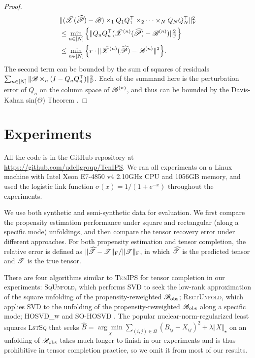 \documentclass{article}
\newcommand{\T}[2][]{#1\mathscr{\MakeUppercase{#2}}}
\newcommand{\norm}[1]{\Vert #1 \Vert}
\newcommand{\fnorm}[1]{\norm{#1}_{\mathrm{F}}}
\newcommand{\nucnorm}[1]{\norm{#1}_\star}
\def\Th{\widehat T}
\def\Ph{\widehat P}
\theoremstyle{plain}
\begin{document}
\begin{proof}
\begin{equation}
		\begin{aligned}
			& \fnorm{(\bar{\T{X}}(\T{\Ph})-\T{B}) \times_1 Q_1Q_1^\top \times_2 \cdots \times_N Q_N Q_N^\top}^2 \\
			& \leq \min_{n \in [N]} \Big\{\fnorm{Q_n Q_n^\top (\bar{\T{X}}^{(n)}(\T{\Ph}) - \T{B}^{(n)})}^2 \Big\}\\
			& \leq \min_{n \in [N]} \Big\{r \cdot \norm{\bar{\T{X}}^{(n)}(\T{\Ph}) - \T{B}^{(n)}}^2 \Big\}.
		\end{aligned}
		\nonumber
	\end{equation}
	The second term can be bounded by the sum of squares of residuals $\sum_{n \in [N]} \fnorm{\T{B}\times_{n} (I - Q_{n} Q_{n}^\top)}^2$. 
	Each of the summand here is the perturbation error of $Q_n$ on the column space of $\T{B}^{(n)}$, and thus can be bounded by the Davis-Kahan sin($\Theta$) Theorem \cite{davis1970rotation, wedin1972perturbation, yu2015useful}. 
\end{proof}


\section{Experiments}
\label{sec:experiments}
All the code is in the GitHub repository at \url{https://github.com/udellgroup/TenIPS}.
We ran all experiments on a Linux machine with Intel\textsuperscript{\textregistered} Xeon\textsuperscript{\textregistered} E7-4850 v4 2.10GHz CPU and 1056GB memory, and used the logistic link function $\sigma(x)=1/(1+e^{-x})$ throughout the experiments.

We use both synthetic and semi-synthetic data for evaluation.
We first compare the propensity estimation performance under square and rectangular (along a specific mode) unfoldings, and then compare the tensor recovery error under different approaches.
For both propensity estimation and tensor completion, the relative error is defined as $\fnorm{\T{\Th} - \T{T}} / \fnorm{\T{T}}$, in which $\T{\Th}$ is the predicted tensor and $\T{T}$ is the true tensor.

There are four algorithms similar to \textsc{TenIPS} for tensor completion in our experiments: \textsc{SqUnfold}, which performs SVD to seek the low-rank approximation of the square unfolding of the propensity-reweighted $\T{B}_\mathrm{obs}$; \textsc{RectUnfold}, which applies SVD to the unfolding of the propensity-reweighted $\T{B}_\mathrm{obs}$ along a specific mode; \textsc{HOSVD\_w} \cite{huang2020hosvd} and \textsc{SO-HOSVD} \cite{xia2017statistically}. 
The popular nuclear-norm-regularized least squares \textsc{LstSq} that seeks $\hat{B} = \underset{X}{\arg \min} \sum_{(i, j) \in \Omega} (B_{ij}  - X_{ij})^2 + \lambda \nucnorm{X}$ on an unfolding of $\T{B}_\mathrm{obs}$ takes much longer to finish in our experiments and is thus prohibitive in tensor completion practice, so we omit it from most of our results. 
\end{document}
